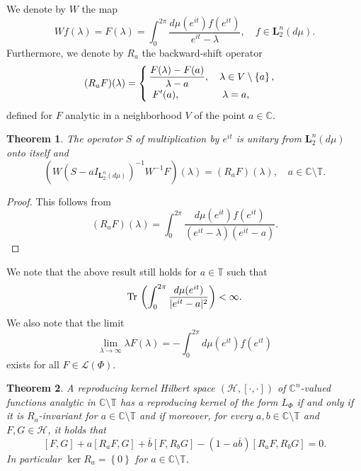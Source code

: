 \documentclass[12pt]{amsart}
\newtheorem{thm}{Theorem}[section]
\theoremstyle{definition}
\theoremstyle{remark}
\numberwithin{equation}{section}
\begin{document}
      We denote by $W$ the map
      \begin{equation}
        Wf({\lambda})=F({\lambda})=\int_0^{2\pi}\frac{d\mu(e^{it})f(e^{it})}{e^{it}-{\lambda}},\quad f\in \mathbf L_2^n(d\mu).
    \end{equation}
    Furthermore, we denote by
      $R_a$ the backward-shift operator
    \begin{equation}
      (R_aF)({\lambda})=\begin{cases}\, \dfrac{F({\lambda})-F(a)}{{\lambda}-a},\quad {\lambda}\in V\setminus\left\{a\right\},\\
        \,\,\, F^\prime(a),\,\,\,\,\, \quad \hspace{0.86cm}{\lambda}=a,\end{cases}
      \end{equation}
      defined for $F$ analytic in a neighborhood $V$ of the point $a\in\mathbb C$.

      \begin{thm}
        The operator $S$ of multiplication by $e^{it}$ is unitary from $\mathbf L_2^n(d\mu)$ onto itself and
        \begin{equation}
          (          W(S-aI_{\mathbf L_2^n(d\mu)})^{-1}W^{-1}F)({\lambda})=(R_aF)({\lambda}),\quad a\in\mathbb C\setminus \mathbb T.
          \end{equation}
        \end{thm}

        \begin{proof}
          This follows from
          \[
            ( R_aF)({\lambda})=\int_0^{2\pi}\frac{d\mu(e^{it})f(e^{it})}{(e^{it}-{\lambda})(e^{it}-a)}.
          \]


        \end{proof}

        We note that the above result still holds for $a\in\mathbb T$ such that
\[
        {\rm Tr}\,\left(\int_0^{2\pi}\frac{d\mu(e^{it})}{|e^{it}-a|^2}\right)<\infty.
\]
We also note that the limit
\begin{equation}
  \lim_{\lambda\rightarrow\infty}\lambda F(\lambda)=-\int_0^{2\pi}d\mu(e^{it})f(e^{it})
\label{lim+}
\end{equation}
exists for all $F\in\mathcal L(\Phi)$.

\begin{thm}
  \label{circle}
  A reproducing kernel Hilbert space $(\mathcal H,[\cdot,\cdot])$ of $\mathbb C^n$-valued functions analytic in $\mathbb C\setminus\mathbb T$ has
  a reproducing kernel of the form $L_\Phi$ if and only if it is $R_a$-invariant for $a\in\mathbb C\setminus\mathbb T$ and if moreover, for every
  $a,b\in\mathbb C\setminus\mathbb T$ and $F,G\in\mathcal H$, it holds that
        \begin{equation}
          \label{structure-ide}
[F,G]+a[R_aF,G]+\overline{b}[F,R_bG]-(1-a\overline{b})[R_aF,R_bG]=0.
          \end{equation}
          In particular $\ker R_a=\left\{0\right\}$ for $a\in\mathbb C\setminus\mathbb T$.
                  \end{thm}
\end{document}
